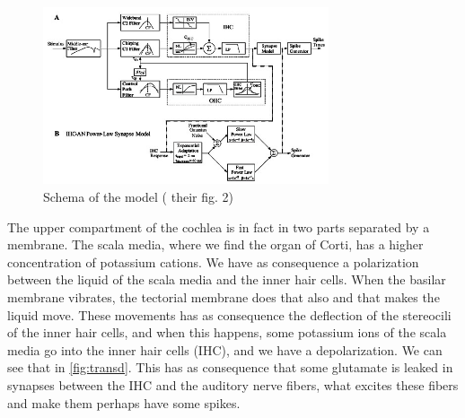 \begin{figure}[ht]
	\centering
  \includegraphics[width=0.75\textwidth]{images/www-bme-rochester-edu-schematicDiagram-level.jpg}
	\caption{Schema of the model (\cite{Model1} their fig. 2)}
	\label{fig:modelsch}
\end{figure}

The upper compartment of the cochlea is in fact in two parts separated by a membrane.
The scala media, where we find the organ of Corti, has a higher 
concentration of potassium cations. We have as consequence a polarization between
the liquid of the scala media and the inner hair cells. 
When the basilar membrane vibrates, the tectorial membrane does 
that also and that makes the liquid move. 
These movements has as consequence the deflection of the stereocili 
of the inner hair cells, and when this happens, some potassium ions of the 
scala media go into the inner hair cells (IHC), and we have a depolarization.
We can see that in \autoref{fig:transd}.
This has as consequence that some glutamate is leaked in synapses %
between the IHC and the auditory nerve fibers, what excites these fibers 
and make them perhaps have some spikes.




